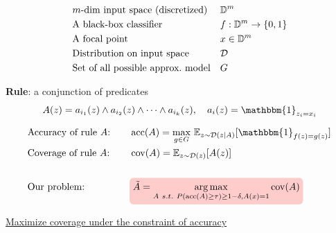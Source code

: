 \documentclass[aspectratio=169]{slide-ja}
\begin{document}
\begin{frame}{}
  \vspace{-1.4em}
  \begin{align*}
     & \text{$m$-dim input space (discretized)}  &  & \mathbb{D}^{m}             \\
     & \text{A black-box classifier}             &  & f:\mathbb{D}^{m}\to\{0,1\} \\
     & \text{A focal point}                      &  & x\in\mathbb{D}^{m}         \\
     & \text{Distribution on input space}        &  & \mathcal{D}         \\
     & \text{Set of all possible approx.\ model} &  & G
  \end{align*}

  \textbf{Rule}: a conjunction of predicates
  \vspace{-0.5em}
  \begin{equation*}
    A(z)=a_{i_1}(z)\wedge a_{i_2}(z)\wedge\dots\wedge a_{i_k}(z),\quad
    a_i(z)=\mathbbm{1}_{z_i=x_i}
  \end{equation*}
\end{frame}

{%
\vfuzz=13.08765pt
\begin{frame}{}
  \bigskip
  \bigskip
  \bigskip

  \begin{alignat*}{2}
     & \text{Accuracy of rule $A$:} & \quad & \Prec(A)=\underset{g\in G}{\max}
    \ \mathbb{E}_{z\sim\mathcal{D}(z|A)}[\mathbbm{1}_{f(z)=g(z)}]
    \COLabel{prec}{}
    \\
     & \text{Coverage of rule $A$:} & \quad & \operatorname{cov}(A)=
    \mathbb{E}_{z\sim\mathcal{D}(z)}[A(z)]
    \COLabel{cov}{}
    \\
    \\
     & \text{Our problem:}          & \quad & \colorrect{red!20}{$
        \tilde{A}=\underset{A\ s.t.
          \ P(\Prec(A)\ge\tau)\ge1-\delta,A(x)=1}  %
        {\arg\max}\operatorname{cov}(A)  %
      $}
    \COLabel{problem}{}
    \\
  \end{alignat*}

  \begin{center}
    \underline{Maximize coverage under the constraint of accuracy}
  \end{center}
\end{frame}
}
\end{document}
